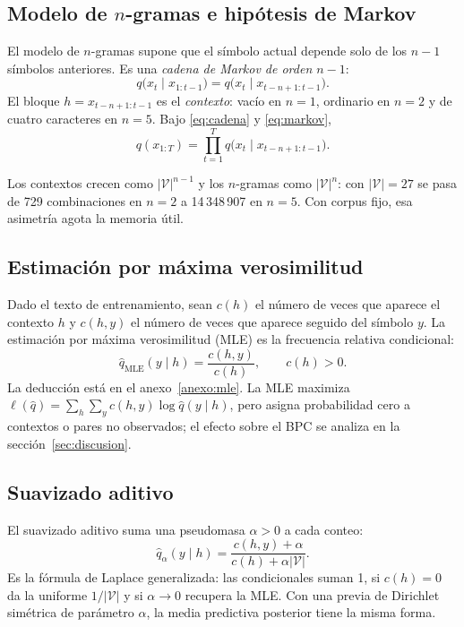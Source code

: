 \documentclass[11pt,letterpaper]{article}
\begin{document}
\subsection{Modelo de $n$-gramas e hipótesis de Markov}

El modelo de $n$-gramas supone que el símbolo actual depende solo de los $n-1$ símbolos anteriores. Es una \emph{cadena de Markov de orden $n-1$}:
\begin{equation}\label{eq:markov}
q\bigl(x_t\mid x_{1:t-1}\bigr)=q\bigl(x_t\mid x_{t-n+1:t-1}\bigr).
\end{equation}
El bloque $h=x_{t-n+1:t-1}$ es el \emph{contexto}: vacío en $n=1$, ordinario en $n=2$ y de cuatro caracteres en $n=5$. Bajo \eqref{eq:cadena} y \eqref{eq:markov},
\begin{equation}\label{eq:ngrama}
q(x_{1:T})=\prod_{t=1}^{T} q\bigl(x_t\mid x_{t-n+1:t-1}\bigr).
\end{equation}

Los contextos crecen como $|\mathcal{V}|^{n-1}$ y los $n$-gramas como $|\mathcal{V}|^{n}$: con $|\mathcal{V}|=27$ se pasa de 729 combinaciones en $n=2$ a 14\,348\,907 en $n=5$. Con corpus fijo, esa asimetría agota la memoria útil.

\subsection{Estimación por máxima verosimilitud}

Dado el texto de entrenamiento, sean $c(h)$ el número de veces que aparece el contexto $h$ y $c(h,y)$ el número de veces que aparece seguido del símbolo $y$. La estimación por máxima verosimilitud (MLE) es la frecuencia relativa condicional:
\begin{equation}\label{eq:mle}
\hat q_{\text{MLE}}(y\mid h)=\frac{c(h,y)}{c(h)},\qquad c(h)>0.
\end{equation}
La deducción está en el anexo~\ref{anexo:mle}. La MLE maximiza $\ell(\hat q)=\sum_h\sum_y c(h,y)\log\hat q(y\mid h)$, pero asigna probabilidad cero a contextos o pares no observados; el efecto sobre el BPC se analiza en la sección~\ref{sec:discusion}.

\subsection{Suavizado aditivo}

El suavizado aditivo suma una pseudomasa $\alpha>0$ a cada conteo:
\begin{equation}\label{eq:suavizado}
\hat q_\alpha(y\mid h)=\frac{c(h,y)+\alpha}{c(h)+\alpha|\mathcal{V}|}.
\end{equation}
Es la fórmula de Laplace generalizada: las condicionales suman 1, si $c(h)=0$ da la uniforme $1/|\mathcal{V}|$ y si $\alpha\to0$ recupera la MLE. Con una previa de Dirichlet simétrica de parámetro $\alpha$, la media predictiva posterior tiene la misma forma.
\end{document}
